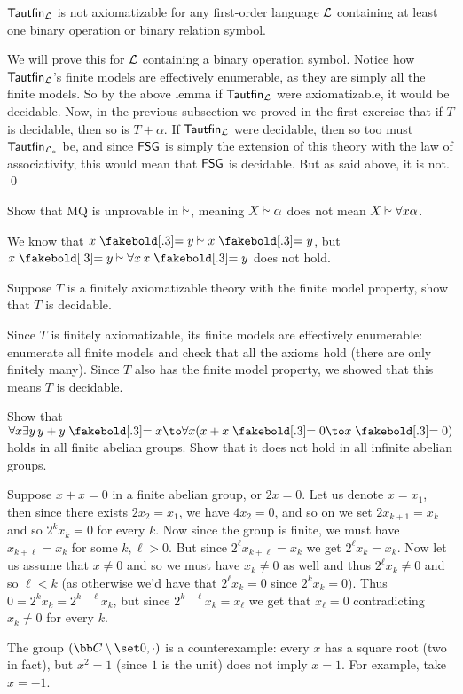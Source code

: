     ${\sf Tautfin}_{\cal L}$ is not axiomatizable for any first-order language ${\cal L}$ containing at least one binary operation or binary relation symbol.

\ethrm

We will prove this for ${\cal L}$ containing a binary operation symbol.
Notice how ${\sf Tautfin}_{\cal L}$'s finite models are effectively enumerable, as they are simply all the finite models.
So by the above lemma if ${\sf Tautfin}_{\cal L}$ were axiomatizable, it would be decidable.
Now, in the previous subsection we proved in the first exercise that if $T$ is decidable, then so is $T+\alpha$.
If ${\sf Tautfin}_{\cal L}$ were decidable, then so too must ${\sf Tautfin}_{\cal L_\circ}$ be, and since ${\sf FSG}$ is simply the extension of this theory with the law of associativity, this would mean
that ${\sf FSG}$ is decidable.
But as said above, it is not.
\qed

\bexerc

    Show that MQ is unprovable in $\vsim$, meaning $X\vsim\alpha$ does not mean $X\vsim\forall x\alpha$.

\eexerc

We know that $x\eq y\vsim x\eq y$, but $x\eq y\vsim\forall x\,x\eq y$ does not hold.

\bexerc

    Suppose $T$ is a finitely axiomatizable theory with the finite model property, show that $T$ is decidable.

\eexerc

Since $T$ is finitely axiomatizable, its finite models are effectively enumerable: enumerate all finite models and check that all the axioms hold (there are only finitely many).
Since $T$ also has the finite model property, we showed that this means $T$ is decidable.

\bexerc

    Show that $\forall x\exists y\,y+y\eq x\to\forall x(x+x\eq0\to x\eq0)$ holds in all finite abelian groups.
    Show that it does not hold in all infinite abelian groups.

\eexerc

Suppose $x+x=0$ in a finite abelian group, or $2x=0$.
Let us denote $x=x_1$, then since there exists $2x_2=x_1$, we have $4x_2=0$, and so on we set $2x_{k+1}=x_k$ and so $2^kx_k=0$ for every $k$.
Now since the group is finite, we must have $x_{k+\ell}=x_k$ for some $k,\ell>0$.
But since $2^\ell x_{k+\ell}=x_k$ we get $2^\ell x_k=x_k$.
Now let us assume that $x\neq0$ and so we must have $x_k\neq0$ as well and thus $2^\ell x_k\neq0$ and so $\ell<k$ (as otherwise we'd have that $2^\ell x_k=0$ since $2^kx_k=0$).
Thus $0=2^kx_k=2^{k-\ell}x_k$, but since $2^{k-\ell}x_k=x_\ell$ we get that $x_\ell=0$ contradicting $x_k\neq0$ for every $k$.

The group $({\bb C}\setminus\set0,\cdot)$ is a counterexample: every $x$ has a square root (two in fact), but $x^2=1$ (since $1$ is the unit) does not imply $x=1$.
For example, take $x=-1$.

